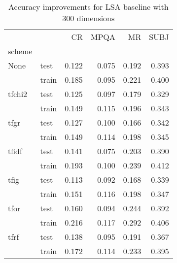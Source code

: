 \begin{table}[H]
\begin{center}

\begin{tabular}{llrrrr}
\toprule
{} &      &  CR &  MPQA &  MR &  SUBJ \\
scheme &  &            &              &            &              \\
\midrule
None & test &      0.122 &        0.075 &      0.192 &        0.393 \\
{} & train &      0.185 &        0.095 &      0.221 &        0.400 \\
tfchi2 & test &      0.125 &        0.097 &      0.179 &        0.329 \\
{} & train &      0.149 &        0.115 &      0.196 &        0.343 \\
tfgr & test &      0.127 &        0.100 &      0.166 &        0.342 \\
{} & train &      0.149 &        0.114 &      0.198 &        0.345 \\
tfidf & test &      0.141 &        0.075 &      0.203 &        0.390 \\
{} & train &      0.193 &        0.100 &      0.239 &        0.412 \\
tfig & test &      0.113 &        0.092 &      0.168 &        0.339 \\
{} & train &      0.151 &        0.116 &      0.198 &        0.347 \\
tfor & test &      0.160 &        0.094 &      0.244 &        0.392 \\
{} & train &      0.216 &        0.117 &      0.292 &        0.406 \\
tfrf & test &      0.138 &        0.095 &      0.191 &        0.367 \\
{} & train &      0.172 &        0.114 &      0.233 &        0.395 \\
\bottomrule
\end{tabular}

\caption[Accuracy improvements for LSA baseline with 300 dimensions]{Accuracy improvements for LSA baseline with 300 dimensions}
\label{tab:lsa:resuts:300}
\end{center}
\end{table}





